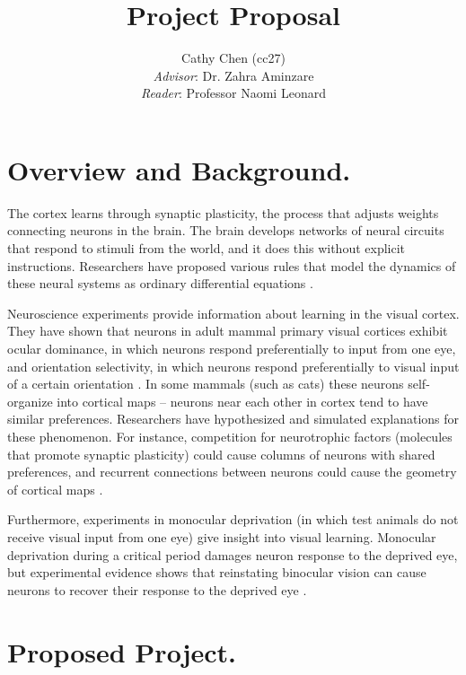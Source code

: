 \documentclass[10pt]{article}
\begin{document}
 
\title{Project Proposal}
\author{Cathy Chen (cc27)\\\textit{Advisor}: Dr. Zahra Aminzare\\ \textit{Reader}: Professor Naomi Leonard}
\maketitle

\section*{Overview and Background.}
The cortex learns through synaptic plasticity, the process that adjusts weights connecting neurons in the brain. The brain develops networks of neural circuits that respond to stimuli from the world, and it does this without explicit instructions. Researchers have proposed various rules that model the dynamics of these neural systems as ordinary differential equations \cite{Dayan2000}.

Neuroscience experiments provide information about learning in the visual cortex. They have shown that neurons in adult mammal primary visual cortices exhibit ocular dominance, in which neurons respond preferentially to input from one eye, and orientation selectivity, in which neurons respond preferentially to visual input of a certain orientation \cite{HubelWiesel1998}. In some mammals (such as cats) these neurons self-organize into cortical maps -- neurons near each other in cortex tend to have similar preferences. Researchers have hypothesized and simulated explanations for these phenomenon. For instance, competition for neurotrophic factors (molecules that promote synaptic plasticity) could cause columns of neurons with shared preferences, and recurrent connections between neurons could cause the geometry of cortical maps \cite{Harris1997}\cite{Galtier2011}.

Furthermore, experiments in monocular deprivation (in which test animals do not receive visual input from one eye) give insight into visual learning. Monocular deprivation during a critical period damages neuron response to the deprived eye, but experimental evidence shows that reinstating binocular vision can cause neurons to recover their response to the deprived eye \cite{Feldman2009}\cite{Mitchell1977}.

\section*{Proposed Project.}
\end{document}
